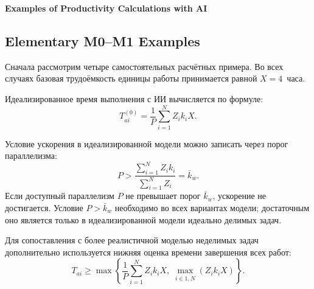 \documentclass[12pt,a4paper]{article}
\theoremstyle{definition}
\begin{document}
  \begin{center}
    \Large\textbf{Examples of Productivity Calculations with AI}
  \end{center}
\fi

\ifdefined\FULLARTICLE
  \newcommand{\detailedexampleheading}[1]{\subsubsection{#1}}
  \newcommand{\detailedsummaryheading}[1]{\subsection{#1}}
\else
  \newcommand{\detailedexampleheading}[1]{\subsection*{#1}}
  \newcommand{\detailedsummaryheading}[1]{\section*{#1}}
\fi

\detailedsummaryheading{Elementary M0--M1 Examples}

Сначала рассмотрим четыре самостоятельных расчётных примера. Во всех случаях базовая трудоёмкость единицы работы принимается равной $X = 4$~часа.

Идеализированное время выполнения с ИИ вычисляется по формуле:
\[
  T_{ai}^{(0)} = \frac{1}{P} \sum_{i=1}^{N} Z_i k_i X.
\]

Условие ускорения в идеализированной модели можно записать через порог параллелизма:
\[
  P > \frac{\sum_{i=1}^{N} Z_i k_i}{\sum_{i=1}^{N} Z_i} = \bar{k}_w.
\]
Если доступный параллелизм $P$ не превышает порог $\bar{k}_w$, ускорение не достигается. Условие $P > \bar{k}_w$ необходимо во всех вариантах модели; достаточным оно является только в идеализированной модели идеально делимых задач.

Для сопоставления с более реалистичной моделью неделимых задач дополнительно используется нижняя оценка времени завершения всех работ:
\[
  T_{ai} \ge \max\left\{ \frac{1}{P} \sum_{i=1}^{N} Z_i k_i X,\; \max_{i \in \overline{1,N}} (Z_i k_i X) \right\}.
\]
\end{document}
